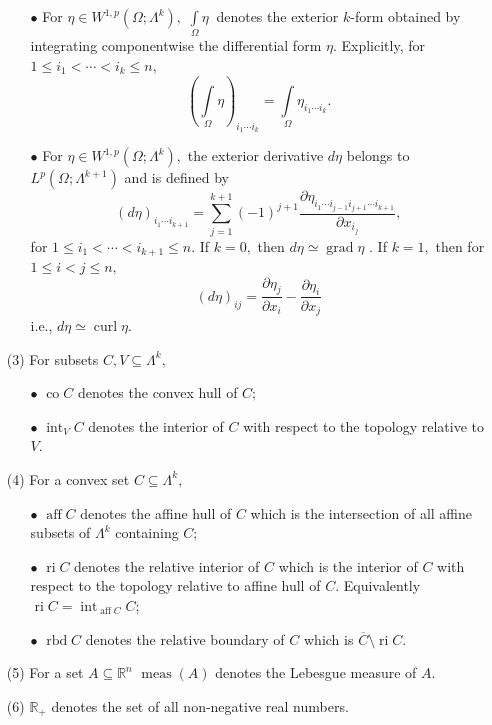 \documentclass[11pt, a4paper, reqno]{amsart}
\numberwithin{equation}{section}
\newcommand{\meas}{\operatorname{meas}}
\newcommand{\curl}{\operatorname{curl}}
\newcommand{\grad}{\operatorname{grad}}
\newcommand{\co}{\operatorname{co}}
\newcommand{\intt}{\operatorname{int}}
\newcommand{\aff}{\operatorname{aff}}
\newcommand{\rbd}{\operatorname{rbd}}
\newcommand{\ri}{\operatorname{ri}}
\begin{document}
\begin{itemize}
\begin{itemize}
       \item [$\bullet$] For $\eta \in W^{1,p}(\Omega;\Lambda^k),$ $\displaystyle \int\limits_{\Omega}\eta\ $ denotes the exterior $k$-form obtained by integrating componentwise the differential form $\eta$. Explicitly, for $1\leq i_1<\cdots < i_k\leq n,$ $$\left(\displaystyle\int\limits_{\Omega}\eta\right)_{i_1\cdots i_k}=\int\limits_{\Omega}\eta_{i_1\cdots i_k}.$$
       \item [$\bullet$] For $\eta\in W^{1,p}(\Omega;\Lambda^k),$ the exterior derivative $d\eta$ belongs to $L^p(\Omega;\Lambda^{k+1})$ and is defined by $$\left(d\eta\right)_{i_1\cdots i_{k+1}}=\displaystyle\sum\limits_{j=1}^{k+1}(-1)^{j+1}\frac{\partial \eta_{i_1\cdots i_{j-1}i_{j+1}\cdots i_{k+1}}}{\partial x_{i_j}},$$
       for $1\leq i_1<\cdots < i_{k+1}\leq n.$ If $k=0,$ then $d\eta \simeq \grad \eta$ . If $k=1,$ then for $1\leq i<j\leq n, $ $$(d\eta)_{ij}=\frac{\partial \eta_j}{\partial x_i}-\frac{\partial \eta_i}{\partial x_j}$$
       i.e., $d\eta \simeq \curl \eta.$
   \end{itemize}
   \item[(3)] For subsets $C,V \subseteq \Lambda^k,$
   \begin{itemize}
       \item [$\bullet$] $\co C$ denotes the convex hull of $C;$
       \item [$\bullet$] $\intt_{V}C$ denotes the interior of $C$ with respect to the topology relative to $V.$ 
   \end{itemize}
   \item [(4)] For a convex set $C\subseteq \Lambda^k,$ 
   \begin{itemize}
       \item [$\bullet$] $\aff C$ denotes the affine hull of $C$ which is the intersection of all affine subsets of $\Lambda^k$ containing $C;$
       \item[$\bullet$]  $\ri C$ denotes the relative interior of $C$ which is the interior of $C$ with respect to the topology relative to affine hull of $C.$ Equivalently $\ri C=\intt_{\aff C}C$; 
       \item [$\bullet$] $\rbd C$ denotes the relative boundary of $C$ which is $\overline{C}\setminus \ri C.$ 
   \end{itemize}
   \item[(5)] For a set $A\subseteq \mathbb R^n$ $\meas (A)$ denotes the Lebesgue measure of $A.$
   \item[(6)] $\mathbb R_{+}$ denotes the set of all non-negative real numbers.
\end{itemize}
\end{document}
